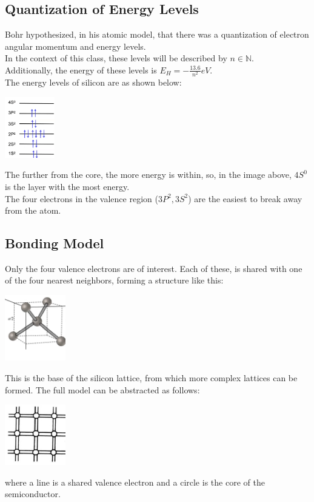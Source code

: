 \documentclass[nobib]{tufte-handout}
\begin{document}
\subsection{Quantization of Energy Levels}
Bohr hypothesized, in his atomic model, that there was a quantization of
electron angular momentum and energy levels.\\ In the context of this class,
these levels will be described by $n \in \mathbb{N}$.\\ Additionally, the
energy of these levels is $E_H = -\frac{13.6}{n^2}eV$.\\ The energy levels of
silicon are as shown below:\\
\begin{center}
    \includegraphics*[height = 100px]{images/si_energy_levels.png}
\end{center}
The further from the core, the more energy is within, so, in the image above, $4S^0$ is the layer with the most energy.\\
The four electrons in the valence region ($3P^2,3S^2$) are the easiest to break away from the atom.
\subsection{Bonding Model}
Only the four valence electrons are of interest. Each of these, is shared with
one of the four nearest neighbors, forming a structure like this:
\begin{center}
    \includegraphics*[width = 100px]{images/silicon_neighbor_bond.png}
\end{center}
This is the base of the silicon lattice, from which more complex lattices can be formed. The full model can be abstracted as follows:
\begin{center}
    \includegraphics*[width = 100px]{images/bonding_model.png}
\end{center}
where a line is a shared valence electron and a circle is the core of the semiconductor.\\
\end{document}
